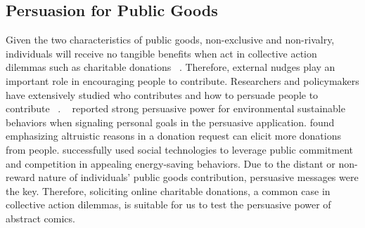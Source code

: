 \subsection{Persuasion for Public Goods}
Given the two characteristics of public goods, non-exclusive and non-rivalry, individuals will receive no tangible benefits when act in collective action dilemmas such as charitable donations ~\cite{marwell1981economists,isaac1982public}. Therefore, external nudges play an important role in encouraging people to contribute. Researchers and policymakers have extensively studied who contributes and how to persuade people to contribute ~\cite{olson2009logic,becker1974theory,andreoni1990impure,miguel2005ethnic,burnett1981psychographic,pessemier1977willingness,burnett1981psychographic}.  ~\textcite{midden2008using} reported strong persuasive power for environmental sustainable behaviors when signaling personal goals in the persuasive application. \textcite{feiler2012mixed} found emphasizing altruistic reasons in a donation request can elicit more donations from people. \textcite{mankoff2010stepgreen} successfully used social technologies to leverage public commitment and competition in appealing energy-saving behaviors. Due to the distant or non-reward nature of individuals' public goods contribution, persuasive messages were the key. Therefore, soliciting online charitable donations, a common case in collective action dilemmas, is suitable for us to test the persuasive power of abstract comics.

